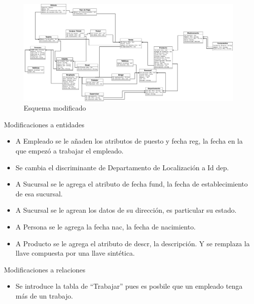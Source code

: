 \documentclass{article}
\begin{document}
    \begin{figure}[H]
    	\centering
	  \includegraphics[scale=0.22]{img/practica05.jpeg}
	  \caption{Esquema modificado}
    \end{figure}
    Modificaciones a entidades
    \begin{itemize}
        \item A Empleado se le añaden los atributos de puesto y fecha reg, la
        fecha en la que empezó a trabajar el empleado.
        \item Se cambia el discriminante de Departamento de Localización a Id dep.
        \item A Sucursal se le agrega el atributo de fecha fund, la fecha de 
        establecimiento de esa sucursal.
        \item A Sucursal se le agrean los datos de su dirección, es particular su
        estado.
        \item A Persona se le agrega la fecha nac, la fecha de nacimiento.
        \item A Producto se le agrega el atributo de descr, la descripción. Y 
        se remplaza la llave compuesta por una llave sintética.
    \end{itemize}

    Modificaciones a relaciones
    \begin{itemize}
        \item Se introduce la tabla de ``Trabajar'' pues es posbile que un
        empleado tenga más de un trabajo.
    \end{itemize}
    
\end{document}
